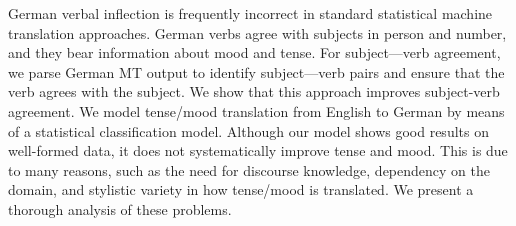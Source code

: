 German verbal inflection is frequently incorrect in standard statistical machine translation approaches. German verbs agree with subjects in person and number, and they bear information about mood and tense. For subject---verb agreement, we parse German MT output to identify subject---verb pairs and ensure that the verb agrees with the subject. We show that this approach improves subject-verb agreement. We model tense/mood translation from English to German by means of a statistical classification model. Although our model shows good results on well-formed data, it does not systematically improve tense and mood. This is due to many reasons, such as the need for discourse knowledge, dependency on the domain, and stylistic variety in how tense/mood is translated. We present a thorough analysis of these problems.

